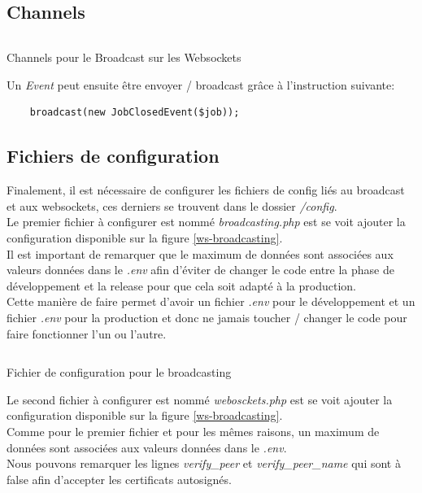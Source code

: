 \documentclass[
    iai, %
    il, %
]{heig-tb}
\begin{document}
\subsection{Channels}

\begin{listing}[H]
    \inputminted{php}{assets/code/channels.php}
    \caption{Channels pour le Broadcast sur les Websockets \label{ws-channels}}
\end{listing}

Un \emph{Event} peut ensuite être envoyer / \Gls{broadcast} grâce à l'instruction suivante:
\begin{lstlisting}
    broadcast(new JobClosedEvent($job));
\end{lstlisting}


\subsection{Fichiers de configuration}
Finalement, il est nécessaire de configurer les fichiers de config liés au \Gls{broadcast} et aux \Gls{websockets}, ces derniers se trouvent dans le dossier \emph{/config}. \\
Le premier fichier à configurer est nommé \emph{broadcasting.php} est se voit ajouter la configuration disponible sur la figure \ref{ws-broadcasting}. \\
Il est important de remarquer que le maximum de données sont associées aux valeurs données dans le \emph{.env} afin d'éviter de changer le code entre la phase de développement et la release pour que cela soit adapté à la production. \\
Cette manière de faire permet d'avoir un fichier \emph{.env} pour le développement et un fichier \emph{.env} pour la production et donc ne jamais toucher / changer le code pour faire fonctionner l'un ou l'autre.

\begin{listing}[H]
    \inputminted{php}{assets/code/broadcasting.php}
    \caption{Fichier de configuration pour le broadcasting \label{ws-broadcasting}}
\end{listing}

Le second fichier à configurer est nommé \emph{webosckets.php} est se voit ajouter la configuration disponible sur la figure \ref{ws-broadcasting}. \\
Comme pour le premier fichier et pour les mêmes raisons, un maximum de données sont associées aux valeurs données dans le \emph{.env}. \\
Nous pouvons remarquer les lignes \emph{verify\_peer} et \emph{verify\_peer\_name} qui sont à false afin d'accepter les certificats autosignés.
\end{document}
